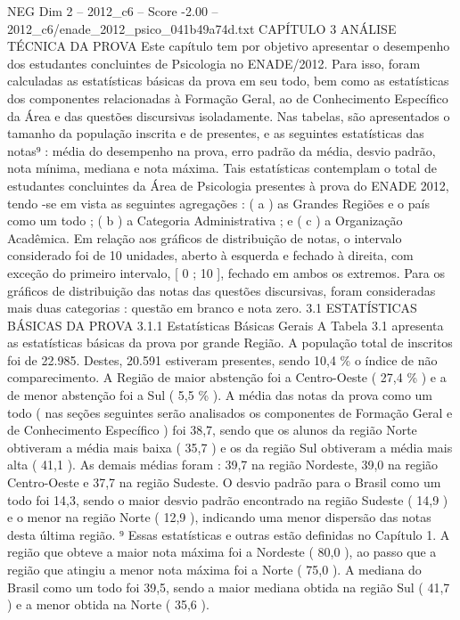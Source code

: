 \begin{textsample}{NEG Dim 2 – 2012\_c6 – Score -2.00 – 2012\_c6/enade\_2012\_psico\_041b49a74d.txt}  \label{ex:f2_neg_183}
CAPÍTULO 3 ANÁLISE TÉCNICA DA PROVA Este capítulo tem por objetivo apresentar o desempenho dos estudantes concluintes de Psicologia no ENADE/2012.
Para isso, foram calculadas as estatísticas básicas da prova em seu todo, bem como as estatísticas dos componentes relacionadas à Formação Geral, ao de Conhecimento Específico da Área e das questões discursivas isoladamente.
Nas tabelas, são apresentados o tamanho da população inscrita e de presentes, e as seguintes estatísticas das notas⁹ : média do desempenho na prova, erro padrão da média, desvio padrão, nota mínima, mediana e nota máxima.
Tais estatísticas contemplam o total de estudantes concluintes da Área de Psicologia presentes à prova do ENADE 2012, tendo -se em vista as seguintes agregações : ( a ) as Grandes Regiões e o país como um todo ; ( b ) a Categoria Administrativa ; e ( c ) a Organização Acadêmica.
Em relação aos gráficos de distribuição de notas, o intervalo considerado foi de 10 unidades, aberto à esquerda e fechado à direita, com exceção do primeiro intervalo, [ 0 ; 10 ], fechado em ambos os extremos.
Para os gráficos de distribuição das notas das questões discursivas, foram consideradas mais duas categorias : questão em branco e nota zero. 3.1 ESTATÍSTICAS BÁSICAS DA PROVA 3.1.1 Estatísticas Básicas Gerais A Tabela 3.1 apresenta as estatísticas básicas da prova por grande Região.
A população total de inscritos foi de 22.985.
Destes, 20.591 estiveram presentes, sendo 10,4 \% o índice de não comparecimento.
A Região de maior abstenção foi a Centro-Oeste ( 27,4 \% ) e a de menor abstenção foi a Sul ( 5,5 \% ).
A média das notas da prova como um todo ( nas seções seguintes serão analisados os componentes de Formação Geral e de Conhecimento Específico ) foi 38,7, sendo que os alunos da região Norte obtiveram a média mais baixa ( 35,7 ) e os da região Sul obtiveram a média mais alta ( 41,1 ).
As demais médias foram : 39,7 na região Nordeste, 39,0 na região Centro-Oeste e 37,7 na região Sudeste.
O desvio padrão para o Brasil como um todo foi 14,3, sendo o maior desvio padrão encontrado na região Sudeste ( 14,9 ) e o menor na região Norte ( 12,9 ), indicando uma menor dispersão das notas desta última região. ⁹ Essas estatísticas e outras estão definidas no Capítulo 1.
A região que obteve a maior nota máxima foi a Nordeste ( 80,0 ), ao passo que a região que atingiu a menor nota máxima foi a Norte ( 75,0 ).
A mediana do Brasil como um todo foi 39,5, sendo a maior mediana obtida na região Sul ( 41,7 ) e a menor obtida na Norte ( 35,6 ).

\end{textsample}
